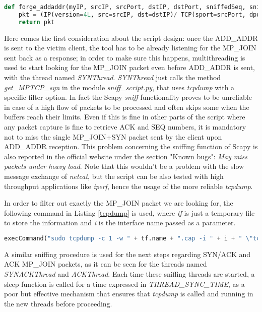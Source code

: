 \begin{lstlisting}[language=python, caption=\textit{forge\_addaddr method}, label=forgeaddaddrfunction] 
def forge_addaddr(myIP, srcIP, srcPort, dstIP, dstPort, sniffedSeq, sniffedAck):
    pkt = (IP(version=4L, src=srcIP, dst=dstIP)/ TCP(sport=srcPort, dport=dstPort, flags="A", seq=sniffedSeq, ack=sniffedAck, options=[TCPOption_MP(mptcp=MPTCP_AddAddr(address_id=ADDRESS_ID, adv_addr=myIP))]))
    return pkt
\end{lstlisting}

Here comes the first consideration about the script design: once the ADD\_ADDR is sent to the victim client, the tool has to be already listening for the MP\_JOIN sent back as a response; in order to make sure this happens, multithreading is used to start looking for the MP\_JOIN packet even before ADD\_ADDR is sent, with the thread named \textit{SYNThread}. \textit{SYNThread} just calls the method \textit{get\_MPTCP\_syn} in the module \textit{sniff\_script.py}, that uses \textit{tcpdump} with a specific filter option. In fact the Scapy \textit{sniff} functionality proves to be unreliable in case of a high flow of packets to be processed and often skips some when the buffers reach their limits. Even if this is fine in other parts of the script where any packet capture is fine to retrieve ACK and SEQ numbers, it is mandatory not to miss the single MP\_JOIN+SYN packet sent by the client upon ADD\_ADDR reception. This problem concerning the sniffing function of Scapy is also reported in the official website under the section "Known bugs": \textit{May miss packets under heavy load}.
Note that this wouldn't be a problem with the slow message exchange of \textit{netcat}, but the script can be also tested with high throughput applications like \textit{iperf}, hence the usage of the more reliable \textit{tcpdump}.

In order to filter out exactly the MP\_JOIN packet we are looking for, the following command in Listing \ref{tcpdump} is used, where \textit{tf} is just a temporary file to store the information and \textit{i} is the interface name passed as a parameter.

\begin{lstlisting}[language=python, caption=\textit{tcpdump for MP\_JOIN}, label=tcpdump]
execCommand("sudo tcpdump -c 1 -w " + tf.name + ".cap -i " + i + " \"tcp[tcpflags] & tcp-syn != 0\" 2>/dev/null", shell = True)
\end{lstlisting}

A similar sniffing procedure is used for the next steps regarding SYN/ACK and ACK MP\_JOIN packets, as it can be seen for the threads named \textit{SYNACKThread} and \textit{ACKThread}. Each time these sniffing threads are started, a sleep function is called for a time expressed in \textit{THREAD\_SYNC\_TIME}, as a poor but effective mechanism that ensures that \textit{tcpdump} is called and running in the new threads before proceeding.


